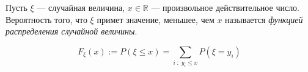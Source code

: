 \begin{definition}
Пусть $\xi$ --- случайная величина, $x \in \mathbb{R}$ --- произвольное действительное число. Вероятность того, что $\xi$ примет значение, меньшее, чем $x$ называется \textit{функцией распределения случайной величины}.

\begin{equation}
    F_\xi (x) := P(\xi \leq x) = \sum_{i \; : \; y_i \leq x} P(\xi=y_i)
\end{equation}

\end{definition}

\newpage